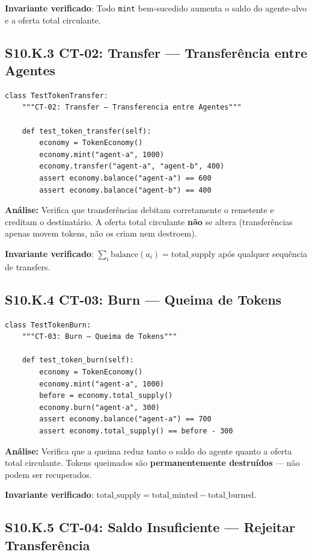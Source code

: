 \textbf{Invariante verificado}: Todo \texttt{mint} bem-sucedido aumenta o saldo do agente-alvo e a oferta total circulante.

\subsection*{S10.K.3 CT-02: Transfer --- Transferência entre Agentes}

\begin{verbatim}
class TestTokenTransfer:
    """CT-02: Transfer — Transferencia entre Agentes"""

    def test_token_transfer(self):
        economy = TokenEconomy()
        economy.mint("agent-a", 1000)
        economy.transfer("agent-a", "agent-b", 400)
        assert economy.balance("agent-a") == 600
        assert economy.balance("agent-b") == 400
\end{verbatim}

\textbf{Análise:} Verifica que transferências debitam corretamente o remetente e creditam o destinatário. A oferta total circulante \textbf{não} se altera (transferências apenas movem tokens, não os criam nem destroem).

\textbf{Invariante verificado}: $\sum_i \text{balance}(a_i) = \text{total\_supply}$ após qualquer sequência de transfers.

\subsection*{S10.K.4 CT-03: Burn --- Queima de Tokens}

\begin{verbatim}
class TestTokenBurn:
    """CT-03: Burn — Queima de Tokens"""

    def test_token_burn(self):
        economy = TokenEconomy()
        economy.mint("agent-a", 1000)
        before = economy.total_supply()
        economy.burn("agent-a", 300)
        assert economy.balance("agent-a") == 700
        assert economy.total_supply() == before - 300
\end{verbatim}

\textbf{Análise:} Verifica que a queima reduz tanto o saldo do agente quanto a oferta total circulante. Tokens queimados são \textbf{permanentemente destruídos} --- não podem ser recuperados.

\textbf{Invariante verificado}: $\text{total\_supply} = \text{total\_minted} - \text{total\_burned}$.

\subsection*{S10.K.5 CT-04: Saldo Insuficiente --- Rejeitar Transferência}

